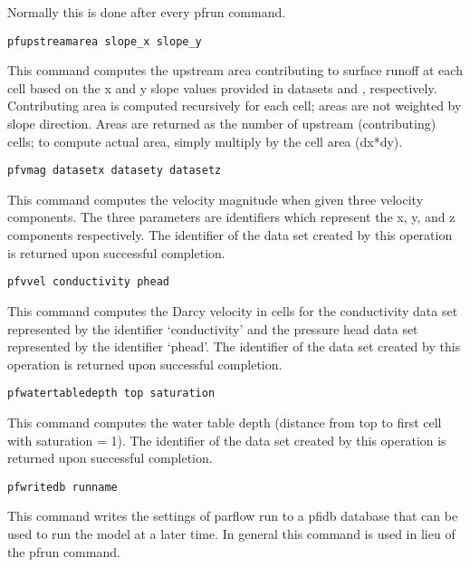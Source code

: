 \begin{description}
Normally this is done after every pfrun command.


\item{\begin{verbatim}pfupstreamarea slope_x slope_y\end{verbatim}}
This command computes the upstream area contributing to surface runoff
at each cell based on the x and y slope values provided in datasets 
 and , respectively. Contributing area is computed recursively
for each cell; areas are not weighted by slope direction. Areas are returned
as the number of upstream (contributing) cells; to compute actual area, simply
multiply by the cell area (dx*dy). 


\item{\begin{verbatim}pfvmag datasetx datasety datasetz\end{verbatim}}
This command computes the velocity magnitude when given three velocity
components.  The three parameters are identifiers which represent
the x, y, and z components respectively.  The identifier of the data
set created by this operation is returned upon successful completion.


\item{\begin{verbatim}pfvvel conductivity phead\end{verbatim}}
This command computes the Darcy velocity in cells for the conductivity
data set represented by the identifier `conductivity' and the pressure
head data set represented by the identifier `phead'.  The identifier  
of the data set created by this operation is returned upon successful 
completion.  

\item{\begin{verbatim}pfwatertabledepth top saturation \end{verbatim}}
 This command computes the water table depth (distance from top to
 first cell with saturation = 1).  The identifier of the data set
 created by this operation is returned upon successful completion.

        
\item{\begin{verbatim}pfwritedb runname\end{verbatim}}
This command writes the settings of parflow run to a pfidb database that
can be used to run the model at a later time. In general this command is used in lieu of the pfrun command. 

\end{description}        

